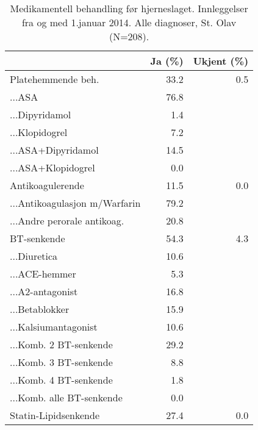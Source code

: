 \documentclass [norsk,a4paper,twoside]{article}\usepackage[]{graphicx}\usepackage[]{color}
\begin{document}
\begin{table}[ht]
\centering
\begin{tabular}{lrr}
  \hline
 & Ja (\%) & Ukjent (\%) \\ 
  \hline
Platehemmende beh. & 33.2 & 0.5 \\ 
  ...ASA & 76.8 &  \\ 
  ...Dipyridamol & 1.4 &  \\ 
  ...Klopidogrel & 7.2 &  \\ 
  ...ASA+Dipyridamol & 14.5 &  \\ 
  ...ASA+Klopidogrel & 0.0 &  \\ 
  Antikoagulerende & 11.5 & 0.0 \\ 
  ...Antikoagulasjon m/Warfarin & 79.2 &  \\ 
  ...Andre perorale antikoag. & 20.8 &  \\ 
  BT-senkende & 54.3 & 4.3 \\ 
  ...Diuretica & 10.6 &  \\ 
  ...ACE-hemmer & 5.3 &  \\ 
  ...A2-antagonist & 16.8 &  \\ 
  ...Betablokker & 15.9 &  \\ 
  ...Kalsiumantagonist & 10.6 &  \\ 
  ...Komb. 2 BT-senkende & 29.2 &  \\ 
  ...Komb. 3 BT-senkende & 8.8 &  \\ 
  ...Komb. 4 BT-senkende & 1.8 &  \\ 
  ...Komb. alle BT-senkende & 0.0 &  \\ 
  Statin-Lipidsenkende & 27.4 & 0.0 \\ 
   \hline
\end{tabular}
\caption{Medikamentell behandling før hjerneslaget. Innleggelser fra og med 1.januar 2014. 
		Alle diagnoser, St. Olav (N=208).} 
\label{tab:MedBehPre1}
\end{table}
\end{document}
